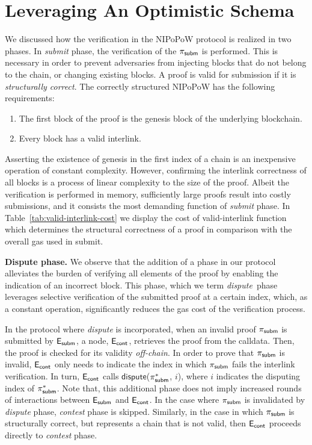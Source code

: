 \section{Leveraging An Optimistic Schema}

We discussed how the verification in the NIPoPoW protocol is realized in two
phases. In \emph{submit} phase, the verification of the $\mathsf{\pi_{subm}}$ is performed.
This is necessary in order to prevent adversaries from injecting blocks that do
not belong to the chain, or changing existing blocks. A proof is valid for
submission if it is \emph{structurally correct}. The correctly structured
NIPoPoW has the following requirements:

\begin{enumerate}
    \item The first block of the proof is the genesis block of the underlying
        blockchain.
    \item Every block has a valid interlink.
\end{enumerate}

Asserting the existence of genesis in the first index of a chain is an
inexpensive operation of constant complexity. However, confirming the interlink
correctness of all blocks is a process of linear complexity to the size of the
proof. Albeit the verification is performed in memory, sufficiently large
proofs result into costly submissions, and it consists the most demanding
function of \emph{submit} phase. In Table~\ref{tab:valid-interlink-cost} we
display the cost of \textsf{valid-interlink} function which determines the
structural correctness of a proof in comparison with the overall gas used in
\textsf{submit}.



\newcommand{\dispute}{\emph{dispute\ }} \noindent \textbf{Dispute phase.} We
observe that the addition of a phase in our protocol alleviates the burden of
verifying all elements of the proof by enabling the indication of an incorrect
block. This phase, which we term \dispute phase leverages selective
verification of the submitted proof at a certain index, which, as a constant
operation, significantly reduces the gas cost of the verification process.

In the protocol where \emph{dispute} is incorporated, when an invalid proof
$\mathsf{\pi_{subm}}$ is submitted by $\mathsf{E_{subm}}$, a node, $\mathsf{E_{cont}}$, retrieves the proof from the
calldata. Then, the proof is checked for its validity \emph{off-chain}. In order
to prove that $\mathsf{\pi_{subm}}$ is invalid, $\mathsf{E_{cont}}$ only needs to indicate the index in
which $\mathsf{\pi_{subm}}$ fails the interlink verification. In turn, $\mathsf{E_{cont}}$ calls
$\textsf{dispute}$($\mathsf{\pi_{subm}^*}$, $i$), where $i$ indicates the disputing index of
$\mathsf{\pi_{subm}^*}$. Note that, this additional phase does not imply increased rounds
of interactions between $\mathsf{E_{subm}}$ and $\mathsf{E_{cont}}$. In the case where $\mathsf{\pi_{subm}}$ is
invalidated by \emph{dispute} phase, \emph{contest} phase is skipped.
Similarly, in the case in which $\mathsf{\pi_{subm}}$ is structurally correct, but
represents a chain that is not valid, then $\mathsf{E_{cont}}$ proceeds directly to
\emph{contest} phase.

